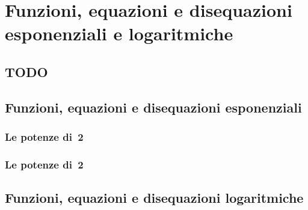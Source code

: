 
\chapter{Funzioni, equazioni e disequazioni esponenziali e logaritmiche}

\section{TODO}

\section{Funzioni, equazioni e disequazioni esponenziali}
\label{sec:esplog_esponenziali}

\subsection{Le potenze di~2}
\label{sec:esplog_potdue}

\subsection{Le potenze di~2}
\label{sec:esplog_potdue}

% 

\section{Funzioni, equazioni e disequazioni logaritmiche}
\label{sec:esplog_logaritmiche}

